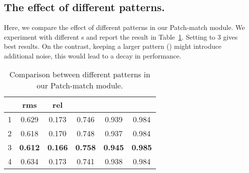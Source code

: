 \documentclass[runningheads]{llncs}
\begin{document}
\begin{appendix}
\section{The effect of different patterns.} 
Here, we compare the effect of different patterns in our Patch-match module. We experiment with different s and report the result in Table~\ref{tab:diffpattern}. Setting  to 3 gives best results. On the contrast, keeping a larger pattern () might introduce additional noise, this would lead to a decay in performance.
\begin{table}[!h] \begin{center}
        \begin{tabular}{c|cc|ccc}
            \toprule[1pt]
              & rms  &  rel  &    &    &   \\ \hline
            1 & 0.629 & 0.173 & 0.746 & 0.939 & 0.984  \\
            2 & 0.618 & 0.170 & 0.748 & 0.937 & 0.984 \\
            3 & \textbf{0.612} & \textbf{0.166} & \textbf{0.758} & \textbf{0.945} & \textbf{0.985} \\
            4 & 0.634 & 0.173 & 0.741 & 0.938 & 0.984 \\
            \toprule[1pt]
        \end{tabular}
    \end{center}
    \caption{Comparison between different patterns in our Patch-match module.}
    \label{tab:diffpattern}
\end{table}
\end{appendix}
\clearpage



\end{document}
